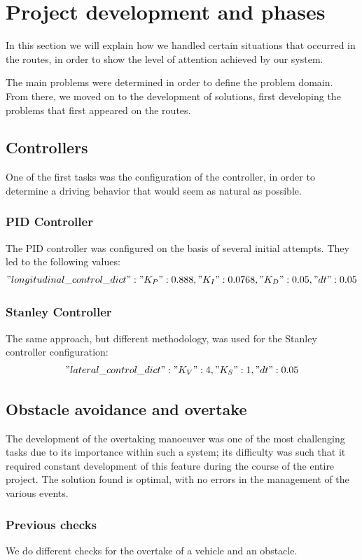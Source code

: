\documentclass{article}
\begin{document}
\section{Project development and phases }
In this section we will explain how we handled certain situations that occurred in the routes, 
in order to show the level of attention achieved by our system.

The main problems were determined in order to define the problem domain. 
From there, we moved on to the development of solutions, first developing the problems that first appeared on the routes.
\subsection{Controllers}
One of the first tasks was the configuration of the controller, in order to determine a driving behavior that 
would seem as natural as possible. 
\subsubsection{PID Controller}
The PID controller was configured on the basis of several initial attempts. They led to the following values:
$$"longitudinal\_control\_dict" : {"K_P": 0.888 , "K_I": 0.0768, "K_D": 0.05, "dt": 0.05}$$

\subsubsection{Stanley Controller}
The same approach, but different methodology, was used for the Stanley controller configuration:
$$"lateral\_control\_dict" : {"K_V": 4, "K_S": 1, "dt": 0.05}$$

\subsection{Obstacle avoidance and overtake}
The development of the overtaking manoeuver was one of the most challenging tasks due to its importance 
within such a system; its difficulty was such that it required constant development of this feature during 
the course of the entire project. The solution found is optimal, with no errors in the management of the 
various events.

\subsubsection*{Previous checks}\label{checkover}
We do different checks for the overtake of a vehicle and an obstacle.
\end{document}
